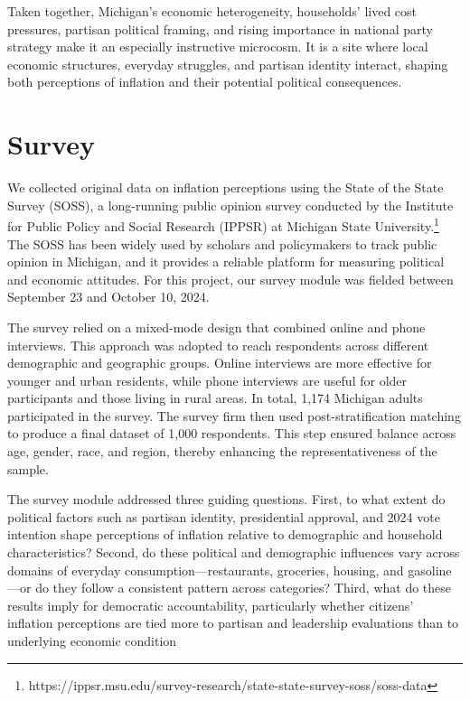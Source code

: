 \documentclass[preprint,12pt,authoryear]{elsarticle}
\begin{document}
Taken together, Michigan’s economic heterogeneity, households’ lived cost pressures, partisan political framing, and rising importance in national party strategy make it an especially instructive microcosm. It is a site where local economic structures, everyday struggles, and partisan identity interact, shaping both perceptions of inflation and their potential political consequences.


\section{Survey}

We collected original data on inflation perceptions using the State of the State Survey (SOSS), a long-running public opinion survey conducted by the Institute for Public Policy and Social Research (IPPSR) at Michigan State University.\footnote{https://ippsr.msu.edu/survey-research/state-state-survey-soss/soss-data} The SOSS has been widely used by scholars and policymakers to track public opinion in Michigan, and it provides a reliable platform for measuring political and economic attitudes. For this project, our survey module was fielded between September 23 and October 10, 2024.

The survey relied on a mixed-mode design that combined online and phone interviews. This approach was adopted to reach respondents across different demographic and geographic groups. Online interviews are more effective for younger and urban residents, while phone interviews are useful for older participants and those living in rural areas. In total, 1,174 Michigan adults participated in the survey. The survey firm then used post-stratification matching to produce a final dataset of 1,000 respondents. This step ensured balance across age, gender, race, and region, thereby enhancing the representativeness of the sample.

The survey module addressed three guiding questions. First, to what extent do political factors such as partisan identity, presidential approval, and 2024 vote intention shape perceptions of inflation relative to demographic and household characteristics? Second, do these political and demographic influences vary across domains of everyday consumption—restaurants, groceries, housing, and gasoline—or do they follow a consistent pattern across categories? Third, what do these results imply for democratic accountability, particularly whether citizens’ inflation perceptions are tied more to partisan and leadership evaluations than to underlying economic condition
\end{document}
